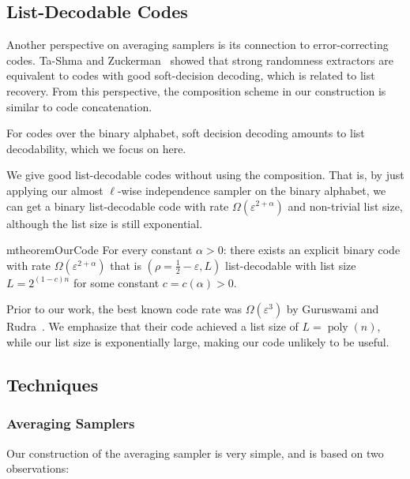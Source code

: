 \documentclass[10pt,a4paper]{article}
\DeclareMathOperator*{\poly}{poly}
\newcommand{\eps}{\varepsilon}
\newcommand{\1}{\mathbbm{1}}
\begin{document}
\subsection{List-Decodable Codes}

Another perspective on averaging samplers is its connection to error-correcting codes. 
Ta-Shma and Zuckerman~\cite{ExtractorCodes} showed that strong randomness extractors are equivalent to codes with good soft-decision decoding, which is related to list recovery.
From this perspective, the composition scheme in our construction is similar to code concatenation. 

For codes over the binary alphabet, soft decision decoding amounts to list decodability, which we focus on here.

We give good list-decodable codes without using the composition. That is, by just applying our almost $\ell$-wise independence sampler on the binary alphabet, we can get a binary list-decodable code with rate $\Omega(\eps^{2 + \alpha})$ and non-trivial list size, although the list size is still exponential.

\begin{restatable}{mtheorem}{OurCode}
    \label{thm:our_code}
    For every constant $\alpha > 0$: there exists an explicit binary code with rate $\Omega(\eps^{2 + \alpha})$ that is $(\rho = \frac{1}{2} - \eps, L)$ list-decodable with list size $L = 2^{(1 - c)n}$ for some constant $c = c(\alpha) > 0$.    
\end{restatable}

Prior to our work, the best known code rate was $\Omega(\eps^3)$ by Guruswami and Rudra~\cite{GR08}. We emphasize that their code achieved a list size of $L = \poly(n)$, while our list size is exponentially large, making our code unlikely to be useful.



\subsection{Techniques}
\subsubsection{Averaging Samplers}
Our construction of the averaging sampler is very simple, and is based on two observations:
\end{document}

